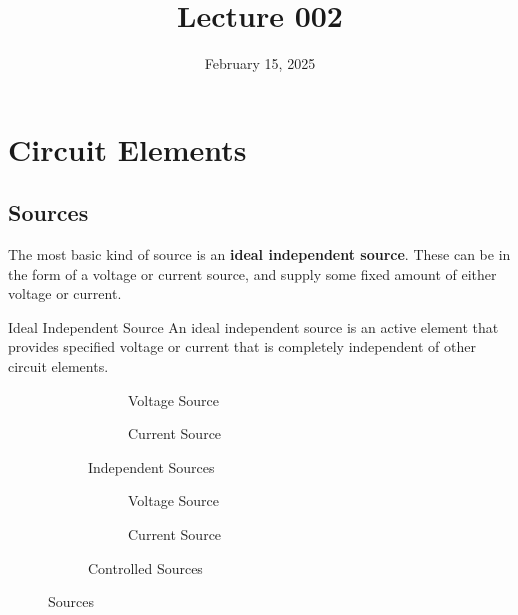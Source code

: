\documentclass[12pt]{article}
\title{Lecture 002}
\date{February 15, 2025}
\begin{document}
\newpage
\section{Circuit Elements}
\label{sec:circuitElements}

\subsection{Sources}
\label{ssec:sources}

The most basic kind of source is an \textbf{ideal independent source}. These can be in the form of a voltage or current source, and supply some fixed amount of either voltage or current.

\begin{definition}{Ideal Independent Source}
  An ideal independent source is an active element that provides specified voltage or current that is completely independent of other circuit elements.
\end{definition}

\begin{figure}[H]
  \centering
  \begin{subfigure}[H]{0.45\textwidth}
    \centering
    \begin{subfigure}[H]{0.45\textwidth}
      \centering
      
      \caption{Voltage Source}
      \label{fig:015}
    \end{subfigure}
    \begin{subfigure}[H]{0.45\textwidth}
      \centering
      
      \caption{Current Source}
      \label{fig:016}
    \end{subfigure}
    \caption{Independent Sources}
    \label{fig:independentSources}
  \end{subfigure}
  \vrule
  \begin{subfigure}[H]{0.45\textwidth}
    \centering
    \begin{subfigure}[H]{0.45\textwidth}
      \centering
      
      \caption{Voltage Source}
      \label{fig:017}
    \end{subfigure}
    \begin{subfigure}[H]{0.45\textwidth}
      \centering
      
      \caption{Current Source}
      \label{fig:018}
    \end{subfigure}
    \caption{Controlled Sources}
    \label{fig:controlledSources}
  \end{subfigure}
  \caption{Sources}
  \label{fig:sources}
\end{figure}
\end{document}
